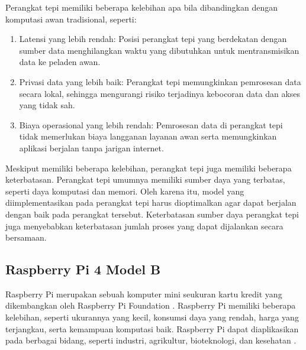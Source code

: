 Perangkat tepi memiliki beberapa kelebihan apa bila dibandingkan dengan komputasi awan tradisional, seperti:
\begin{enumerate}
    \item Latensi yang lebih rendah: Posisi perangkat tepi yang berdekatan dengan sumber data menghilangkan waktu yang dibutuhkan untuk mentransmisikan data ke peladen awan.
    \item Privasi data yang lebih baik: Perangkat tepi memungkinkan pemrosesan data secara lokal, sehingga mengurangi risiko terjadinya kebocoran data dan akses yang tidak sah.
    \item Biaya operasional yang lebih rendah: Pemrosesan data di perangkat tepi tidak memerlukan biaya langganan layanan awan serta memungkinkan aplikasi berjalan tanpa jarigan internet.
\end{enumerate}

Meskiput memiliki beberapa kelebihan, perangkat tepi juga memiliki beberapa keterbatasan.
Perangkat tepi umumnya memiliki sumber daya yang terbatas, seperti daya komputasi dan memori.
Oleh karena itu, model yang diimplementasikan pada perangkat tepi harus dioptimalkan agar dapat berjalan dengan baik pada perangkat tersebut.
Keterbatasan sumber daya perangkat tepi juga menyebabkan keterbatasan jumlah proses yang dapat dijalankan secara bersamaan.

\subsection{Raspberry Pi 4 Model B}
\label{subsec: landasan-raspi}
%
Raspberry Pi merupakan sebuah komputer mini seukuran kartu kredit yang dikembangkan oleh Raspberry Pi Foundation \parencite{8756967}. 
Raspberry Pi memiliki beberapa kelebihan, seperti ukurannya yang kecil, konsumsi daya yang rendah, harga yang terjangkau, serta kemampuan komputasi baik.
Raspberry Pi dapat diaplikasikan pada berbagai bidang, seperti industri, agrikultur, bioteknologi, dan kesehatan \parencite{9760691}.


